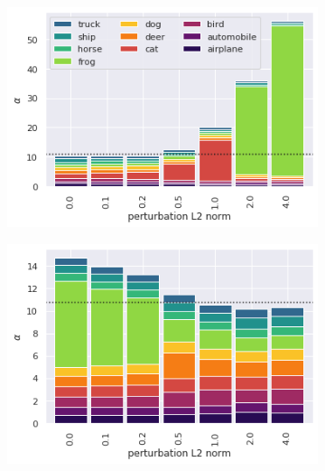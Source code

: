 \begin{figure}[ht!]
    \centering
        \begin{subfigure}[t]{0.49\columnwidth}
        \centering
        \includegraphics[width=0.99 \textwidth]{sections/008_icml2021/eval/ddnet_unc_ood_cifar10_alphas.png}
    \end{subfigure}%
    \begin{subfigure}[t]{0.49\columnwidth}
        \centering
        \includegraphics[width=0.99 \textwidth]{sections/008_icml2021/eval/ddnet_unc_id_cifar10_alphas.png}
    \end{subfigure}%



\end{figure}

